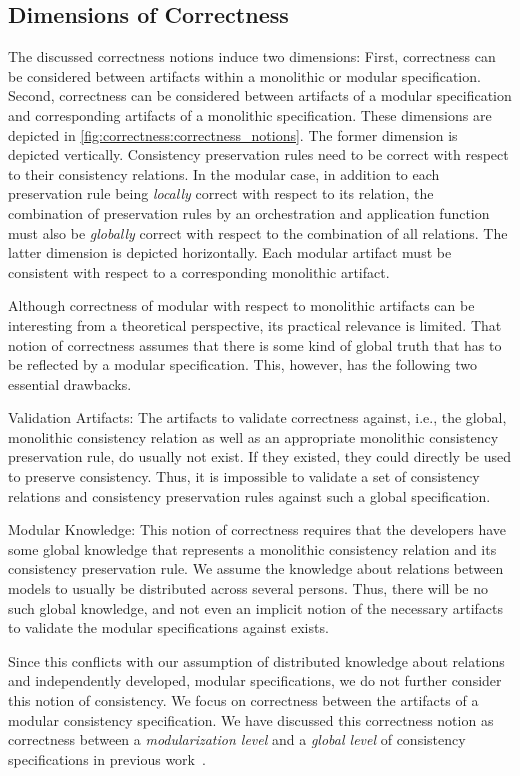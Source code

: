 \subsection{Dimensions of Correctness}
\label{chap:correctness:notions_correctness:dimensions}

The discussed correctness notions induce two dimensions: First, correctness can be considered between artifacts within a monolithic or modular specification. Second, correctness can be considered between artifacts of a modular specification and corresponding artifacts of a monolithic specification. These dimensions are depicted in \autoref{fig:correctness:correctness_notions}.
The former dimension is depicted vertically. Consistency preservation rules need to be correct with respect to their consistency relations.
In the modular case, in addition to each preservation rule being \emph{locally} correct with respect to its relation, the combination of preservation rules by an orchestration and application function must also be \emph{globally} correct with respect to the combination of all relations.
The latter dimension is depicted horizontally. Each modular artifact must be consistent with respect to a corresponding monolithic artifact.

Although correctness of modular with respect to monolithic artifacts can be interesting from a theoretical perspective, its practical relevance is limited.
That notion of correctness assumes that there is some kind of global truth that has to be reflected by a modular specification.
This, however, has the following two essential drawbacks.
\begin{properdescription}
    \item[Validation Artifacts:] The artifacts to validate correctness against, i.e., the global, monolithic consistency relation as well as an appropriate monolithic consistency preservation rule, do usually not exist. If they existed, they could directly be used to preserve consistency. Thus, it is impossible to validate a set of consistency relations and consistency preservation rules against such a global specification.
    \item[Modular Knowledge:] This notion of correctness requires that the developers have some global knowledge that represents a monolithic consistency relation and its consistency preservation rule. We assume the knowledge about relations between models to usually be distributed across several persons. Thus, there will be no such global knowledge, and not even an implicit notion of the necessary artifacts to validate the modular specifications against exists.
\end{properdescription}
%
Since this conflicts with our assumption of distributed knowledge about relations and independently developed, modular specifications, we do not further consider this notion of consistency.
We focus on correctness between the artifacts of a modular consistency specification.
We have discussed this correctness notion as correctness between a \emph{modularization level} and a \emph{global level} of consistency specifications in previous work~.



